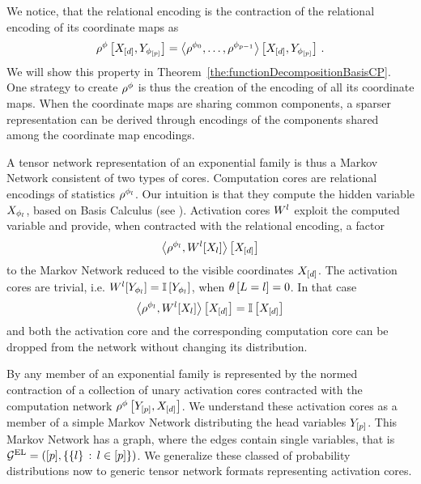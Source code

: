 We notice, that the relational encoding is the contraction of the relational encoding of its coordinate maps as 
	\[ \rho^{\phi}\left[X_{[d]},Y_{\phi_{[p]}}\right] = \left\langle \rho^{\phi_{0}},\ldots,\rho^{\phi_{p-1}}\right\rangle \left[ X_{[d]},Y_{\phi_{[p]}} \right] \, .  \]
We will show this property in Theorem~\ref{the:functionDecompositionBasisCP}.
One strategy to create $\rho^{\phi}$ is thus the creation of the encoding of all its coordinate maps.
When the coordinate maps are sharing common components, a sparser representation can be derived through encodings of the components shared among the coordinate map encodings.


A tensor network representation of an exponential family is thus a Markov Network consistent of two types of cores.
Computation cores are relational encodings of statistics $\rho^{\phi_{l}}$.
Our intuition is that they compute the hidden variable $X_{\phi_{l}}$, based on Basis Calculus (see ).
Activation cores $W^{l}$ exploit the computed variable and provide, when contracted with the relational encoding, a factor 
	\[ \left\langle \rho^{\phi_{l}}, W^{l}[X_{l}]\right\rangle \left[ X_{[d]} \right]  \]
to the Markov Network reduced to the visible coordinates $X_{[d]}$.
The activation cores are trivial, i.e. $W^{l}[Y_{\phi_{l}}]=\mathbb{I}\left[Y_{\phi_{l}}\right]$, when $\theta\left[L=l\right]=0$.
In that case 
	\[  \left\langle \rho^{\phi_{l}}, W^{l}[X_{l}]\right\rangle \left[ X_{[d]} \right]
	= \mathbb{I}\left[X_{[d]}\right] \]
and both the activation core and the corresponding computation core can be dropped from the network without changing its distribution.

By  any member of an exponential family is represented by the normed contraction of a collection of unary activation cores contracted with the computation network $\rho^{\phi}\left[Y_{[p]},X_{[d]}\right]$.
We understand these activation cores as a member of a simple Markov Network distributing the head variables $Y_{[p]}$.
This Markov Network has a graph, where the edges contain single variables, that is $\mathcal{G}^{\mathrm{EL}}=([p],\{\{l\} \, : \, l\in[p]\})$.
We generalize these classed of probability distributions now to generic tensor network formats representing activation cores.

